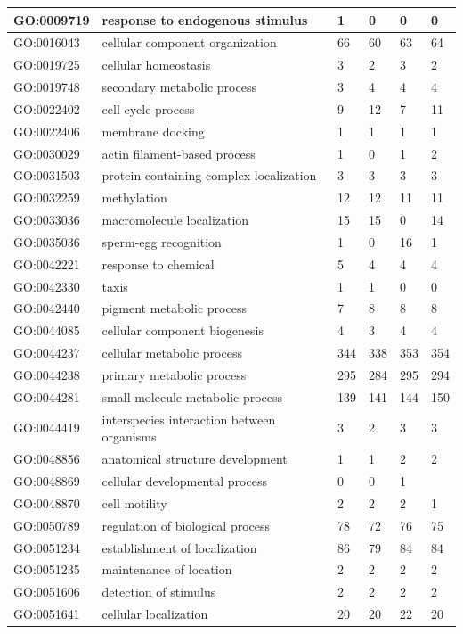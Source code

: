 \documentclass[12pt]{article}
\begin{document}
\begin{longtable}{ | p{2.2cm} | p{4cm} |p{2cm} | p{2cm} | p{2cm} | p{2cm} |}
 \hline
GO:0009719&response to endogenous stimulus&1&0&0&0\\
 \hline
GO:0016043&cellular component organization&66&60&63&64\\
 \hline
GO:0019725&cellular homeostasis&3&2&3&2\\
 \hline
GO:0019748&secondary metabolic process&3&4&4&4\\
 \hline
GO:0022402&cell cycle process&9&12&7&11\\
 \hline
GO:0022406&membrane docking&1&1&1&1\\
 \hline
GO:0030029&actin filament-based process&1&0&1&2\\
 \hline
GO:0031503&protein-containing complex localization&3&3&3&3\\
 \hline
GO:0032259&methylation&12&12&11&11\\
 \hline
GO:0033036&macromolecule localization&15&15&0&14\\
 \hline
GO:0035036&sperm-egg recognition&1&0&16&1\\
 \hline
GO:0042221&response to chemical&5&4&4&4\\
 \hline
GO:0042330&taxis&1&1&0&0\\
 \hline
GO:0042440&pigment metabolic process&7&8&8&8\\
 \hline
GO:0044085&cellular component biogenesis&4&3&4&4\\
 \hline
GO:0044237&cellular metabolic process&344&338&353&354\\
 \hline
GO:0044238&primary metabolic process&295&284&295&294\\
 \hline
GO:0044281&small molecule metabolic process&139&141&144&150\\
 \hline
GO:0044419&interspecies interaction between organisms&3&2&3&3\\
 \hline
GO:0048856&anatomical structure development&1&1&2&2\\
 \hline
GO:0048869&cellular developmental process&0&0&1&\\
 \hline
GO:0048870&cell motility&2&2&2&1\\
 \hline
GO:0050789&regulation of biological process&78&72&76&75\\
 \hline
GO:0051234&establishment of localization&86&79&84&84\\
 \hline
GO:0051235&maintenance of location&2&2&2&2\\
 \hline
GO:0051606&detection of stimulus&2&2&2&2\\
 \hline
GO:0051641&cellular localization&20&20&22&20\\

\end{longtable}
\end{document}

